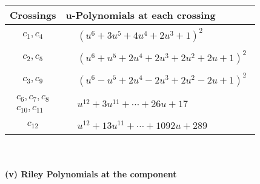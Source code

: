 \documentclass[1p]{elsarticle_modified}
\theoremstyle{definition}
\begin{document}
\begin{tabular}{m{50pt}|m{274pt}}
Crossings & \hspace{64pt}u-Polynomials at each crossing \\
\hline $$\begin{aligned}c_{1},c_{4}\end{aligned}$$&$\begin{aligned}
&(u^6+3 u^5+4 u^4+2 u^3+1)^2
\end{aligned}$\\
\hline $$\begin{aligned}c_{2},c_{5}\end{aligned}$$&$\begin{aligned}
&(u^6+u^5+2 u^4+2 u^3+2 u^2+2 u+1)^2
\end{aligned}$\\
\hline $$\begin{aligned}c_{3},c_{9}\end{aligned}$$&$\begin{aligned}
&(u^6- u^5+2 u^4-2 u^3+2 u^2-2 u+1)^2
\end{aligned}$\\
\hline $$\begin{aligned}c_{6},c_{7},c_{8}\\c_{10},c_{11}\end{aligned}$$&$\begin{aligned}
&u^{12}+3 u^{11}+\cdots+26 u+17
\end{aligned}$\\
\hline $$\begin{aligned}c_{12}\end{aligned}$$&$\begin{aligned}
&u^{12}+13 u^{11}+\cdots+1092 u+289
\end{aligned}$\\
\hline
\end{tabular}\\~\\
\newpage\renewcommand{\arraystretch}{1}
\flushleft \textbf{(v) Riley Polynomials at the component}\newline \\
\end{document}
